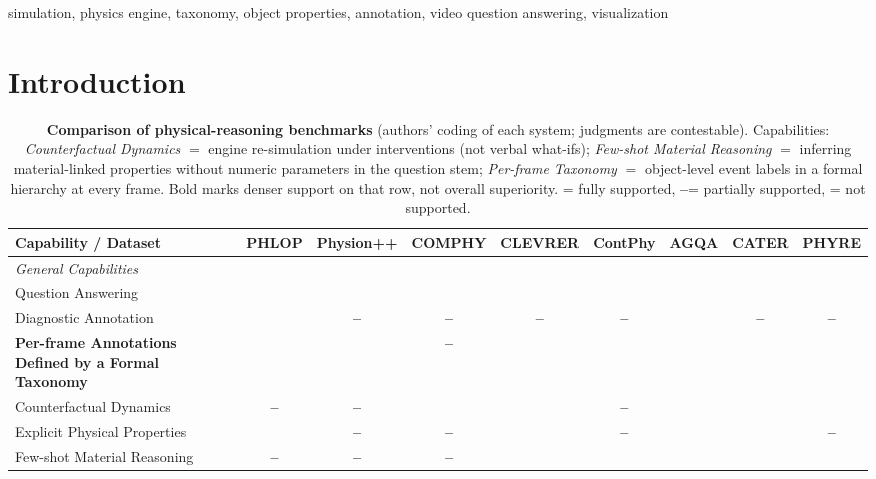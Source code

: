 \documentclass[conference]{IEEEtran}
\newcommand{\cmark}{\textcolor{green!60!black}{\ding{51}}} %
\newcommand{\xmark}{\textcolor{red}{\ding{55}}}            %
\newcommand{\warn}{\textbf{--}}
\begin{document}
\begin{IEEEkeywords}
simulation, physics engine, taxonomy, object properties, annotation, video question answering, visualization
\end{IEEEkeywords}



\section{Introduction}

\begin{table}[!h]
\centering
\small
\setlength{\tabcolsep}{5pt}
\renewcommand{\arraystretch}{1.2}
\caption{
\textbf{Comparison of physical-reasoning benchmarks} (authors' coding of each system; judgments are contestable).
Capabilities: \textit{Counterfactual Dynamics} $=$ engine re-simulation under interventions (not verbal what-ifs);
\textit{Few-shot Material Reasoning} $=$ inferring material-linked properties without numeric parameters in the question stem;
\textit{Per-frame Taxonomy} $=$ object-level event labels in a formal hierarchy at every frame.
Bold marks denser support on that row, not overall superiority.
\cmark = fully supported, \warn = partially supported, \xmark = not supported.
}
\begin{tabular}{p{5.1cm}cccccccc}
\toprule
\textbf{Capability / Dataset} &
\textbf{PHLOP} &
\textbf{Physion++} &
\textbf{COMPHY} &
\textbf{CLEVRER} &
\textbf{ContPhy} &
\textbf{AGQA} &
\textbf{CATER} &
\textbf{PHYRE} \\
\midrule
\multicolumn{9}{l}{\textit{General Capabilities}} \\
Question Answering                   & \cmark & \cmark & \cmark & \cmark & \cmark & \cmark & \cmark & \xmark \\
Diagnostic Annotation                & \cmark & \warn  & \warn  & \warn  & \warn  & \xmark & \warn  & \warn \\
\textbf{Per-frame Annotations Defined by a Formal Taxonomy}   & \textbf{\cmark} & \xmark & \warn  & \xmark & \xmark & \xmark & \xmark & \xmark \\
Counterfactual Dynamics              & \warn  & \warn  & \cmark & \cmark & \warn  & \xmark & \xmark & \xmark \\
Explicit Physical Properties         & \cmark & \warn  & \warn  & \xmark & \warn  & \xmark & \xmark & \warn \\
Few-shot Material Reasoning          & \warn  & \warn  & \warn  & \xmark & \xmark & \xmark & \xmark & \xmark \\

\end{tabular}
\end{table}
\end{document}
